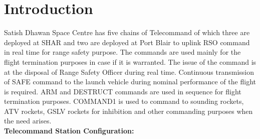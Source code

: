 \chapter{Introduction} \label{Chapter1}
Satish Dhawan Space Centre has five chains of Telecommand of which three are deployed at SHAR and two are deployed at Port Blair to uplink RSO command in real time for range safety purpose. The commands are used mainly for the flight termination purposes in case if it is warranted. The issue of the command is at the disposal of Range Safety Officer during real time. Continuous transmission of SAFE command to the launch vehicle during nominal performance of the flight is required. ARM and DESTRUCT commands are used in sequence for flight termination purposes. COMMAND1 is used to command to sounding rockets, ATV rockets, GSLV rockets for inhibition and other commanding purposes when the need arises. \newline \\
\textbf{Telecommand Station Configuration:}

